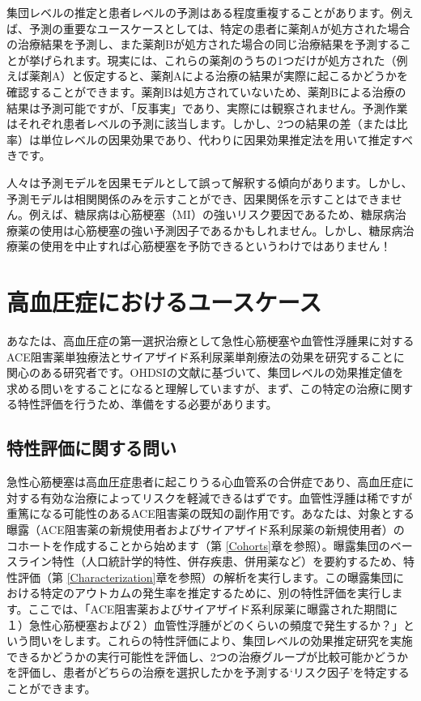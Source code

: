 \documentclass[
  11pt]{book}
\makeatletter
\newenvironment{kframe}{%
\medskip{}
\setlength{\fboxsep}{.8em}
 \def\at@end@of@kframe{}%
 \ifinner\ifhmode%
  \def\at@end@of@kframe{\end{minipage}}%
  \begin{minipage}{\columnwidth}%
 \fi\fi%
 \def\FrameCommand##1{\hskip\@totalleftmargin \hskip-\fboxsep
 \colorbox{myShadeColor}{##1}\hskip-\fboxsep
     \hskip-\linewidth \hskip-\@totalleftmargin \hskip\columnwidth}%
 \MakeFramed {\advance\hsize-\width
   \@totalleftmargin\z@ \linewidth\hsize
   \@setminipage}}%
 {\par\unskip\endMakeFramed%
 \at@end@of@kframe}
\newenvironment{rmdblock}[1]
  {
  \begin{itemize}
  \renewcommand{\labelitemi}{
    \raisebox{-.7\height}[0pt][0pt]{
      {\setkeys{Gin}{width=3em,keepaspectratio}\texttt{[image: images/\#1]}}
    }
  }
  \setlength{\fboxsep}{1em}
  \begin{kframe}
  \item
  }
  {
  \end{kframe}
  \end{itemize}
  }
\newenvironment{rmdimportant}
  {\begin{rmdblock}{important}}
  {\end{rmdblock}}
\theoremstyle{definition}
\theoremstyle{definition}
\theoremstyle{definition}
\theoremstyle{definition}
\theoremstyle{remark}
\makeatother
\begin{document}
集団レベルの推定と患者レベルの予測はある程度重複することがあります。例えば、予測の重要なユースケースとしては、特定の患者に薬剤Aが処方された場合の治療結果を予測し、また薬剤Bが処方された場合の同じ治療結果を予測することが挙げられます。現実には、これらの薬剤のうちの1つだけが処方された（例えば薬剤A）と仮定すると、薬剤Aによる治療の結果が実際に起こるかどうかを確認することができます。薬剤Bは処方されていないため、薬剤Bによる治療の結果は予測可能ですが、「反事実」であり、実際には観察されません。予測作業はそれぞれ患者レベルの予測に該当します。しかし、2つの結果の差（または比率）は単位レベルの因果効果であり、代わりに因果効果推定法を用いて推定すべきです。

\begin{rmdimportant}
人々は予測モデルを因果モデルとして誤って解釈する傾向があります。しかし、予測モデルは相関関係のみを示すことができ、因果関係を示すことはできません。例えば、糖尿病は心筋梗塞（MI）の強いリスク要因であるため、糖尿病治療薬の使用は心筋梗塞の強い予測因子であるかもしれません。しかし、糖尿病治療薬の使用を中止すれば心筋梗塞を予防できるというわけではありません！
\end{rmdimportant}

\section{高血圧症におけるユースケース}\label{ux9ad8ux8840ux5727ux75c7ux306bux304aux3051ux308bux30e6ux30fcux30b9ux30b1ux30fcux30b9}

あなたは、高血圧症の第一選択治療として急性心筋梗塞や血管性浮腫果に対するACE阻害薬単独療法とサイアザイド系利尿薬単剤療法の効果を研究することに関心のある研究者です。OHDSIの文献に基づいて、集団レベルの効果推定値を求める問いをすることになると理解していますが、まず、この特定の治療に関する特性評価を行うため、準備をする必要があります。

\subsection{特性評価に関する問い}\label{ux7279ux6027ux8a55ux4fa1ux306bux95a2ux3059ux308bux554fux3044}

急性心筋梗塞は高血圧症患者に起こりうる心血管系の合併症であり、高血圧症に対する有効な治療によってリスクを軽減できるはずです。血管性浮腫は稀ですが重篤になる可能性のあるACE阻害薬の既知の副作用です。あなたは、対象とする曝露（ACE阻害薬の新規使用者およびサイアザイド系利尿薬の新規使用者）のコホートを作成することから始めます（第 \ref{Cohorts}章を参照）。曝露集団のベースライン特性（人口統計学的特性、併存疾患、併用薬など）を要約するため、特性評価（第 \ref{Characterization}章を参照）の解析を実行します。この曝露集団における特定のアウトカムの発生率を推定するために、別の特性評価を実行します。ここでは、「ACE阻害薬およびサイアザイド系利尿薬に曝露された期間に１）急性心筋梗塞および２）血管性浮腫がどのくらいの頻度で発生するか？」という問いをします。これらの特性評価により、集団レベルの効果推定研究を実施できるかどうかの実行可能性を評価し、2つの治療グループが比較可能かどうかを評価し、患者がどちらの治療を選択したかを予測する`リスク因子'を特定することができます。
\end{document}
